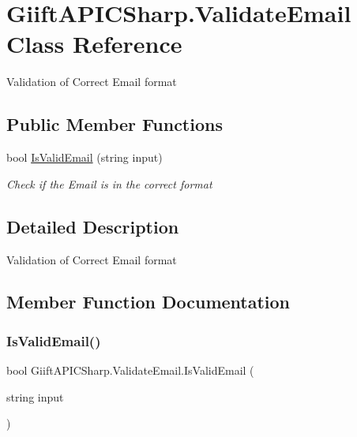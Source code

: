 \hypertarget{class_giift_a_p_i_c_sharp_1_1_validate_email}{}\section{Giift\+A\+P\+I\+C\+Sharp.\+Validate\+Email Class Reference}
\label{class_giift_a_p_i_c_sharp_1_1_validate_email}


Validation of Correct Email format  


\subsection*{Public Member Functions}
\begin{DoxyCompactItemize}
\item 
bool \hyperlink{class_giift_a_p_i_c_sharp_1_1_validate_email_a3af3024dbf153b3274b536a171c58b41}{Is\+Valid\+Email} (string input)
\begin{DoxyCompactList}\small\item\em Check if the Email is in the correct format \end{DoxyCompactList}\end{DoxyCompactItemize}


\subsection{Detailed Description}
Validation of Correct Email format 



\subsection{Member Function Documentation}
\mbox{\label{class_giift_a_p_i_c_sharp_1_1_validate_email_a3af3024dbf153b3274b536a171c58b41}} 
\subsubsection{\texorpdfstring{Is\+Valid\+Email()}{IsValidEmail()}}
{\footnotesize\ttfamily bool Giift\+A\+P\+I\+C\+Sharp.\+Validate\+Email.\+Is\+Valid\+Email (\begin{DoxyParamCaption}\item[{string}]{input }\end{DoxyParamCaption})\hspace{0.3cm}{\ttfamily [inline]}}



